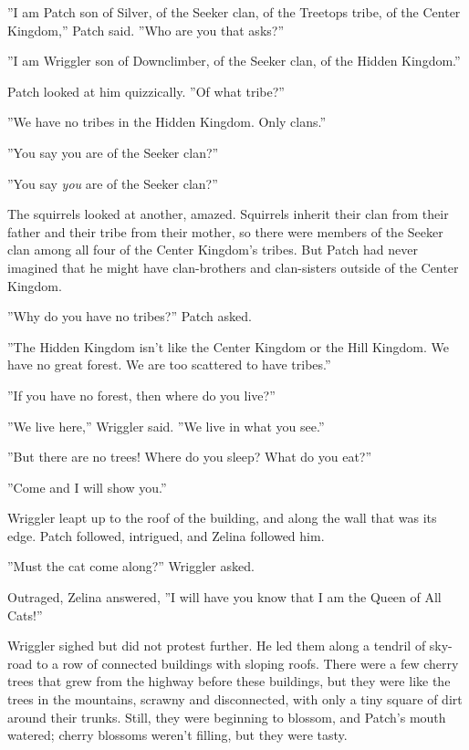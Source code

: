 \documentclass[11pt]{article}
\begin{document}
 ''I am Patch son of Silver, of the Seeker clan, of the Treetops tribe, of the Center Kingdom,'' Patch said. ''Who are you that asks?''\par
 ''I am Wriggler son of Downclimber, of the Seeker clan, of the Hidden Kingdom.''\par
 Patch looked at him quizzically. ''Of what tribe?''\par
 ''We have no tribes in the Hidden Kingdom. Only clans.''\par
 ''You say you are of the Seeker clan?''\par
 ''You say {\it you} are of the Seeker clan?''\par
 The squirrels looked at another, amazed. Squirrels inherit their clan from their father and their tribe from their mother, so there were members of the Seeker clan among all four of the Center Kingdom's tribes. But Patch had never imagined that he might have clan-brothers and clan-sisters outside of the Center Kingdom.\par
 ''Why do you have no tribes?'' Patch asked.\par
 ''The Hidden Kingdom isn't like the Center Kingdom or the Hill Kingdom. We have no great forest. We are too scattered to have tribes.''\par
 ''If you have no forest, then where do you live?''\par
 ''We live here,'' Wriggler said. ''We live in what you see.''\par
 ''But there are no trees! Where do you sleep? What do you eat?''\par
 ''Come and I will show you.''\par
 Wriggler leapt up to the roof of the building, and along the wall that was its edge. Patch followed, intrigued, and Zelina followed him.\par
 ''Must the cat come along?'' Wriggler asked.\par
 Outraged, Zelina answered, ''I will have you know that I am the Queen of All Cats!''\par
 Wriggler sighed but did not protest further. He led them along a tendril of sky-road to a row of connected buildings with sloping roofs. There were a few cherry trees that grew from the highway before these buildings, but they were like the trees in the mountains, scrawny and disconnected, with only a tiny square of dirt around their trunks. Still, they were beginning to blossom, and Patch's mouth watered; cherry blossoms weren't filling, but they were tasty.\par
\end{document}
